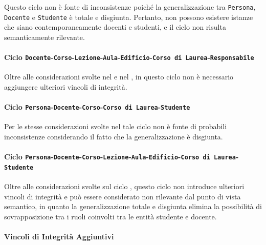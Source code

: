 \documentclass[a4paper,11pt]{article}
\begin{document}
Questo ciclo non è fonte di inconsistenze poiché la generalizzazione tra \texttt{Persona}, \texttt{Docente} e \texttt{Studente} è totale e disgiunta.
Pertanto, non possono esistere istanze che siano contemporaneamente docenti e studenti, e il ciclo non risulta semanticamente rilevante.


\paragraph{Ciclo \texttt{Docente}-\texttt{Corso}-\texttt{Lezione}-\texttt{Aula}-\texttt{Edificio}-\texttt{Corso di Laurea}-\texttt{Responsabile}}
\label{cycle:teacher_course_lesson_room_building_degree_resp}

Oltre alle considerazioni svolte nel  e nel , in questo ciclo non è necessario aggiungere ulteriori vincoli di integrità.


\paragraph{Ciclo \texttt{Persona}-\texttt{Docente}-\texttt{Corso}-\texttt{Corso di Laurea}-\texttt{Studente}}

Per le stesse considerazioni svolte nel  tale ciclo non è fonte di probabili inconsistenze considerando il fatto che la generalizzazione è disgiunta.


\paragraph{Ciclo \texttt{Persona}-\texttt{Docente}-\texttt{Corso}-\texttt{Lezione}-\texttt{Aula}-\texttt{Edificio}-\texttt{Corso di Laurea}-\texttt{Studente}}

Oltre alle considerazioni svolte sul ciclo , questo ciclo non introduce ulteriori vincoli di integrità e può essere considerato non rilevante dal punto di vista semantico, in quanto la generalizzazione totale e disgiunta elimina la possibilità di sovrapposizione tra i ruoli coinvolti tra le entità studente e docente.


\paragraph{Vincoli di Integrità Aggiuntivi}
\label{sec:integrity_constraints}
\end{document}
